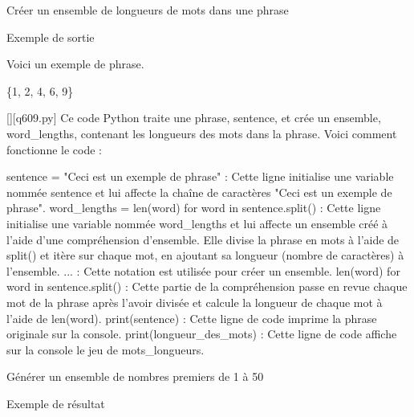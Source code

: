         \question
        Créer un ensemble de longueurs de mots dans une phrase

Exemple de sortie

Voici un exemple de phrase.

\{1, 2, 4, 6, 9\}
        \par
        \begin{solution}
            \renewcommand{\nomfichier}{q609.py}
            \pythonfile{\chemincode \nomfichier}[][\nomfichier]
            Ce code Python traite une phrase, sentence, et crée un ensemble, word_lengths, contenant les longueurs des mots dans la phrase. Voici comment fonctionne le code :

    sentence = "Ceci est un exemple de phrase" : Cette ligne initialise une variable nommée sentence et lui affecte la chaîne de caractères "Ceci est un exemple de phrase".
    word_lengths = {len(word) for word in sentence.split()} : Cette ligne initialise une variable nommée word_lengths et lui affecte un ensemble créé à l'aide d'une compréhension d'ensemble. Elle divise la phrase en mots à l'aide de split() et itère sur chaque mot, en ajoutant sa longueur (nombre de caractères) à l'ensemble.
        {...} : Cette notation est utilisée pour créer un ensemble.
        len(word) for word in sentence.split() : Cette partie de la compréhension passe en revue chaque mot de la phrase après l'avoir divisée et calcule la longueur de chaque mot à l'aide de len(word).
    print(sentence) : Cette ligne de code imprime la phrase originale sur la console.
    print(longueur_des_mots) : Cette ligne de code affiche sur la console le jeu de mots_longueurs.
        \end{solution}
        

        \question
        Générer un ensemble de nombres premiers de 1 à 50

Exemple de résultat

